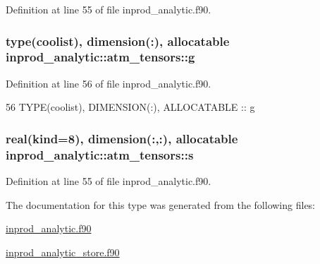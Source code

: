 Definition at line 55 of file inprod\+\_\+analytic.\+f90.

\subsubsection[{\texorpdfstring{g}{g}}]{\setlength{\rightskip}{0pt plus 5cm}type({\bf coolist}), dimension(\+:), allocatable inprod\+\_\+analytic\+::atm\+\_\+tensors\+::g\hspace{0.3cm}{\ttfamily [private]}}\hypertarget{structinprod__analytic_1_1atm__tensors_a63ff90c051660c3b798743810e798dac}{}\label{structinprod__analytic_1_1atm__tensors_a63ff90c051660c3b798743810e798dac}


Definition at line 56 of file inprod\+\_\+analytic.\+f90.


\begin{DoxyCode}
56      \textcolor{keywordtype}{TYPE}(coolist), \textcolor{keywordtype}{DIMENSION(:)}, \textcolor{keywordtype}{ALLOCATABLE} :: g
\end{DoxyCode}
\subsubsection[{\texorpdfstring{s}{s}}]{\setlength{\rightskip}{0pt plus 5cm}real(kind=8), dimension(\+:,\+:), allocatable inprod\+\_\+analytic\+::atm\+\_\+tensors\+::s\hspace{0.3cm}{\ttfamily [private]}}\hypertarget{structinprod__analytic_1_1atm__tensors_ad95a5329b72aae59807e7cdf043ab52c}{}\label{structinprod__analytic_1_1atm__tensors_ad95a5329b72aae59807e7cdf043ab52c}


Definition at line 55 of file inprod\+\_\+analytic.\+f90.



The documentation for this type was generated from the following files\+:\begin{DoxyCompactItemize}
\item 
\hyperlink{inprod__analytic_8f90}{inprod\+\_\+analytic.\+f90}\item 
\hyperlink{inprod__analytic__store_8f90}{inprod\+\_\+analytic\+\_\+store.\+f90}\end{DoxyCompactItemize}
